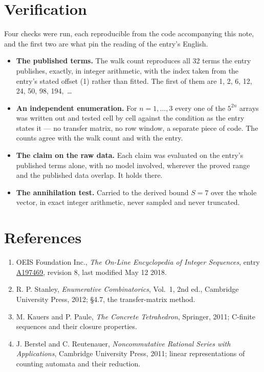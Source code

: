 \documentclass[11pt]{article}
\theoremstyle{definition}
\begin{document}
\section{Verification}

Four checks were run, each reproducible from the code accompanying this note, and the first two are what pin the reading of the entry's English.

\begin{itemize}

\item {\bfseries The published terms.} The walk count reproduces all 32 terms the entry publishes, exactly, in integer arithmetic, with the index taken from the entry's stated offset (1) rather than fitted. The first of them are 1, 2, 6, 12, 24, 50, 98, 194,~\dots

\item {\bfseries An independent enumeration.} For $n = 1,\dots,3$ every one of the $5^{2n}$ arrays was written out and tested cell by cell against the condition as the entry states it --- no transfer matrix, no row window, a separate piece of code. The counts agree with the walk count and with the entry.

\item {\bfseries The claim on the raw data.} Each claim was evaluated on the entry's published terms alone, with no model involved, wherever the proved range and the published data overlap. It holds there.

\item {\bfseries The annihilation test.} Carried to the derived bound $S = 7$ over the whole vector, in exact integer arithmetic, never sampled and never truncated.

\end{itemize}

\section{References}

\begin{enumerate}

\item OEIS Foundation Inc., \emph{The On-Line Encyclopedia of Integer Sequences}, entry \href{https://oeis.org/A197469}{A197469}, revision 8, last modified May 12 2018.

\item R. P. Stanley, \emph{Enumerative Combinatorics}, Vol.~1, 2nd ed., Cambridge University Press, 2012; \S4.7, the transfer-matrix method.

\item M. Kauers and P. Paule, \emph{The Concrete Tetrahedron}, Springer, 2011; C-finite sequences and their closure properties.

\item J. Berstel and C. Reutenauer, \emph{Noncommutative Rational Series with Applications}, Cambridge University Press, 2011; linear representations of counting automata and their reduction.

\end{enumerate}
\end{document}

